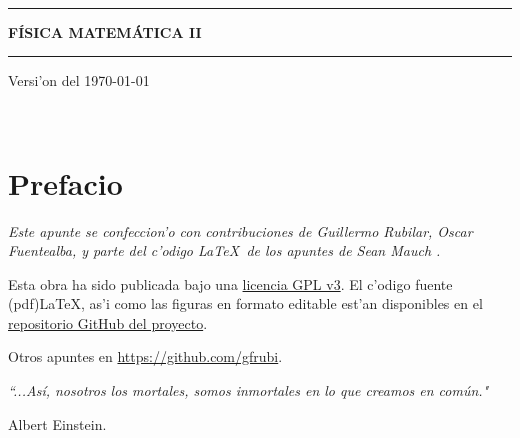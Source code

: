 \documentclass[letterpaper,11pt]{report}
\begin{document}
\sffamily

\thispagestyle{empty}
\begin{center}

\ 

\vspace{6.5cm}

\rule{15cm}{0.1cm}

\vspace{1.5cm}

{\huge \textsc{\textbf{F\'ISICA MATEM\'ATICA II}}}

\vspace{1.5cm}

\rule{15cm}{0.1cm}

\vspace{1.5cm}

Versi'on del \today

\end{center}


\newpage
\thispagestyle{empty}
\ \\
\newpage
\setcounter{page}{1}

\pagestyle{plain}
\chapter*{Prefacio}
\bigskip
\bigskip
\bigskip
\bigskip
\bigskip
\bigskip



\bigskip\emph{Este apunte se confeccion'o con contribuciones de Guillermo Rubilar, Oscar Fuentealba, y parte del c'odigo \LaTeX\, de los apuntes de Sean Mauch \cite{Mauch}.} 

\bigskip
\bigskip
\bigskip
\bigskip
\bigskip



Esta obra ha sido publicada bajo una \href{https://github.com/gfrubi/FM2/blob/master/LICENSE}{licencia GPL v3}. El c'odigo fuente (pdf)\LaTeX, as'i como las figuras en formato editable est'an disponibles en el \href{https://github.com/gfrubi/FM2}{repositorio GitHub del proyecto}.

\bigskip
\bigskip
\bigskip
\bigskip
\bigskip
\bigskip

Otros apuntes en \url{https://github.com/gfrubi}.

\bigskip
\bigskip
\bigskip
\bigskip
\bigskip
\bigskip





\emph{\textquotedblleft ...As\'i, nosotros los mortales, somos
inmortales en lo que creamos en com\'un."}

\begin{flushright}
Albert Einstein.
\end{flushright}
\newpage

\tableofcontents
{}
\setcounter{page}{1}








\appendix





\end{document}
